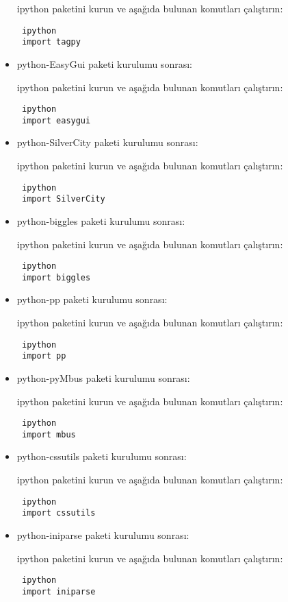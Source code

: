 \documentclass[a4paper,10pt]{article}
\begin{document}
\begin{itemize}
ipython paketini kurun ve aşağıda bulunan komutları çalıştırın:
\begin{verbatim}
 ipython
 import tagpy
\end{verbatim}

\item python-EasyGui paketi kurulumu sonrası:

ipython paketini kurun ve aşağıda bulunan komutları çalıştırın:
\begin{verbatim}
 ipython
 import easygui
\end{verbatim}

\item python-SilverCity paketi kurulumu sonrası:

ipython paketini kurun ve aşağıda bulunan komutları çalıştırın:
\begin{verbatim}
 ipython
 import SilverCity
\end{verbatim}

\item python-biggles paketi kurulumu sonrası:

ipython paketini kurun ve aşağıda bulunan komutları çalıştırın:
\begin{verbatim}
 ipython
 import biggles
\end{verbatim}

\item python-pp paketi kurulumu sonrası:

ipython paketini kurun ve aşağıda bulunan komutları çalıştırın:
\begin{verbatim}
 ipython
 import pp
\end{verbatim}

\item python-pyMbus paketi kurulumu sonrası:

ipython paketini kurun ve aşağıda bulunan komutları çalıştırın:
\begin{verbatim}
 ipython
 import mbus
\end{verbatim}

\item python-cssutils paketi kurulumu sonrası:

ipython paketini kurun ve aşağıda bulunan komutları çalıştırın:
\begin{verbatim}
 ipython
 import cssutils
\end{verbatim}

\item python-iniparse paketi kurulumu sonrası:

ipython paketini kurun ve aşağıda bulunan komutları çalıştırın:
\begin{verbatim}
 ipython
 import iniparse
\end{verbatim}


\end{itemize}
\end{document}
